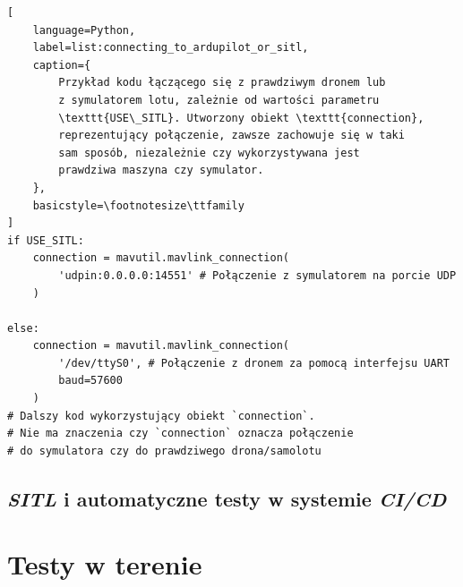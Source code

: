 \begin{lstlisting}[
    language=Python,
    label=list:connecting_to_ardupilot_or_sitl,
    caption={
        Przykład kodu łączącego się z prawdziwym dronem lub 
        z symulatorem lotu, zależnie od wartości parametru
        \texttt{USE\_SITL}. Utworzony obiekt \texttt{connection},
        reprezentujący połączenie, zawsze zachowuje się w taki
        sam sposób, niezależnie czy wykorzystywana jest
        prawdziwa maszyna czy symulator. 
    },
    basicstyle=\footnotesize\ttfamily
]
if USE_SITL:
    connection = mavutil.mavlink_connection(
        'udpin:0.0.0.0:14551' # Połączenie z symulatorem na porcie UDP
    )

else:    
    connection = mavutil.mavlink_connection(
        '/dev/ttyS0', # Połączenie z dronem za pomocą interfejsu UART
        baud=57600
    )
# Dalszy kod wykorzystujący obiekt `connection`.
# Nie ma znaczenia czy `connection` oznacza połączenie
# do symulatora czy do prawdziwego drona/samolotu
\end{lstlisting}

\subsection{\textit{SITL} i automatyczne testy w systemie \textit{CI/CD}}



\section{Testy w terenie}

